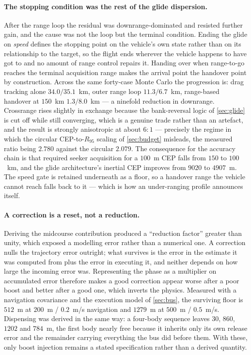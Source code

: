\documentclass[11pt,a4paper]{article}
\theoremstyle{definition}
\numberwithin{equation}{section}
\begin{document}
\paragraph{The stopping condition was the rest of the glide dispersion.} After the range loop the residual was downrange-dominated and resisted further gain, and the cause was not the loop but the terminal condition. Ending the glide on \emph{speed} defines the stopping point on the vehicle's own state rather than on its relationship to the target, so the flight ends wherever the vehicle happens to have got to and no amount of range control repairs it. Handing over when range-to-go reaches the terminal acquisition range makes the arrival point the handover point by construction. Across the same forty-case Monte Carlo the progression is: drag tracking alone $34.0/35.1$~km, outer range loop $11.3/6.7$~km, range-based handover at $150$~km $1.3/8.0$~km --- a ninefold reduction in downrange. Crossrange rises slightly in exchange because the bank-reversal logic of \cref{sec:glide} is cut off while still converging, which is a genuine trade rather than an artefact, and the result is strongly anisotropic at about $6\!:\!1$ --- precisely the regime in which the circular CEP-to-$R_{95}$ scaling of \cref{sec:budget} misleads, the measured ratio being $2.780$ against the circular $2.079$. The consequence for the accuracy chain is that required seeker acquisition for a $100$~m CEP falls from $150$ to $100$~km, and the glide architecture's inertial CEP improves from $9020$ to $4907$~m. The speed gate is retained underneath as a floor, so a handover range the vehicle cannot reach falls back to it --- which is how an under-ranging profile announces itself.

\paragraph{A correction is a reset, not a reduction.} Deriving the midcourse contribution produced a ``reduction factor'' greater than unity, which exposed a modelling error rather than a numerical one. A correction nulls the trajectory error outright; what survives is the error in the estimate it was computed from plus the error in executing it, and neither depends on how large the incoming error was. Representing the phase as a multiplier on accumulated error therefore makes a good correction appear worse after a poor boost and better after a good one, which inverts the physics. Measured with a navigation covariance and the execution model of \cref{sec:bus}, the surviving floor is $512$~m at $200$~m / $0.2$~m/s navigation and $1279$~m at $500$~m / $0.5$~m/s. Dispensing was derived in the same way: a four-body sequence leaves $30$, $860$, $1202$ and $784$~m, the first body nearly free because it inherits only its own release error and the remainder carrying everything the bus did before them. With these, only boost injection remains a stated specification rather than a derived quantity.
\end{document}
